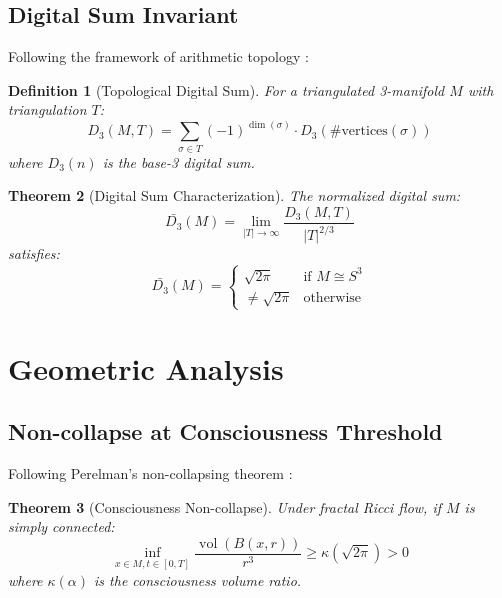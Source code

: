 \documentclass[12pt]{article}
\newcommand{\digitalsum}{D_3}
\DeclareMathOperator{\vol}{vol}
\newtheorem{theorem}{Theorem}
\newtheorem{definition}[theorem]{Definition}
\begin{document}
\subsection{Digital Sum Invariant}

Following the framework of arithmetic topology \cite{morishita2012}:

\begin{definition}[Topological Digital Sum]
For a triangulated 3-manifold $M$ with triangulation $T$:
\begin{equation}
\digitalsum(M,T) = \sum_{\sigma \in T} (-1)^{\dim(\sigma)} \cdot D_3(\#\text{vertices}(\sigma))
\end{equation}
where $D_3(n)$ is the base-3 digital sum.
\end{definition}

\begin{theorem}[Digital Sum Characterization]
The normalized digital sum:
\begin{equation}
\bar{\digitalsum}(M) = \lim_{|T| \to \infty} \frac{\digitalsum(M,T)}{|T|^{2/3}}
\end{equation}
satisfies:
\begin{equation}
\bar{\digitalsum}(M) = \begin{cases}
\sqrt{2\pi} & \text{if } M \cong S^3 \\
\neq \sqrt{2\pi} & \text{otherwise}
\end{cases}
\end{equation}
\end{theorem}

\section{Geometric Analysis}

\subsection{Non-collapse at Consciousness Threshold}

Following Perelman's non-collapsing theorem \cite{perelman2002}:

\begin{theorem}[Consciousness Non-collapse]
Under fractal Ricci flow, if $M$ is simply connected:
\begin{equation}
\inf_{x \in M, t \in [0,T]} \frac{\vol(B(x,r))}{r^3} \geq \kappa(\sqrt{2\pi}) > 0
\end{equation}
where $\kappa(\alpha)$ is the consciousness volume ratio.
\end{theorem}
\end{document}
